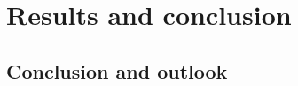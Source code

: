 \documentclass[12pt, a4paper]{book}
\begin{document}
\part{Results and conclusion}

\chapter{Conclusion and outlook}\label{chap:conclusion}


\clearpage


\appendix















\clearpage
{}
{}
\printbibliography
\end{document}
